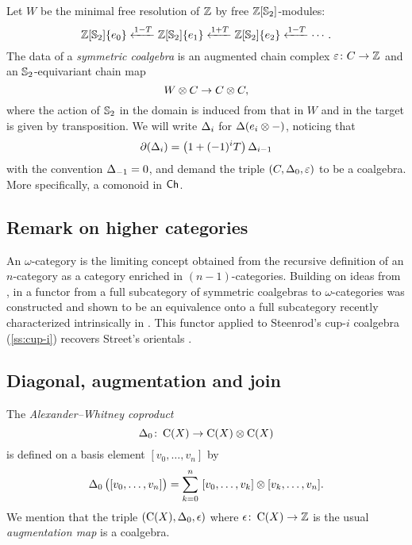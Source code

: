 Let $W$ be the minimal free resolution of $\mathbb{Z}$ by free $\mathbb{Z}[\mathbb{S}_2]$-modules:
\[
\mathbb{Z}[\mathbb{S}_2]\{e_0\} \xleftarrow{1-T} \mathbb{Z}[\mathbb{S}_2]\{e_1\} \xleftarrow{1+T} \mathbb{Z}[\mathbb{S}_2]\{e_2\} \xleftarrow{1-T} \dotsb.
\]
The data of a \textit{symmetric coalgebra} is an augmented chain complex $\varepsilon \colon C \to \mathbb{Z}$ and an $\mathbb{S}_2$-equivariant chain map
\[
W \otimes C \to C \otimes C,
\]
where the action of $\mathbb{S}_2$ in the domain is induced from that in $W$ and in the target is given by transposition.
We will write $\operatorname{\Delta}_i$ for $\operatorname{\Delta}(e_i \otimes -)$, noticing that
\[
\partial(\operatorname{\Delta}_i) = \big( 1+(-1)^i T \big) \operatorname{\Delta}_{i-1}
\]
with the convention $\operatorname{\Delta}_{-1} = 0$, and demand the triple $(C, \operatorname{\Delta}_0, \varepsilon)$ to be a coalgebra.
More specifically, a comonoid in $\mathsf{Ch}$.

\subsection{Remark on higher categories}
\label{ss:higher categories}

An $\omega$-category is the limiting concept obtained from the recursive definition of an $n$-category as a category enriched in $(n-1)$-categories.
Building on ideas from \cite{brown1981cubes, kapranov1991polycategory, steiner2004omega}, in \cite{medina2020globular} a functor from a full subcategory of symmetric coalgebras to $\omega$-categories was constructed and shown to be an equivalence onto a full subcategory recently characterized intrinsically in \cite{ozornova2022steiner}.
This functor applied to Steenrod's cup-$i$ coalgebra (\cref{ss:cup-i}) recovers Street's orientals \cite{street1987orientals}.

\subsection{Diagonal, augmentation and join}

The \textit{Alexander--Whitney coproduct}
\[
\operatorname{\Delta}_0 \colon \operatorname{C}(X) \to \operatorname{C}(X) \otimes \operatorname{C}(X)
\]
is defined on a basis element $[v_0, \dots, v_n]$ by
\begin{equation*} \label{e:alexander-whitney coalgebra}
	\operatorname{\Delta}_0 \big( [v_0, \dots, v_n] \big) =
	\sum_{k=0}^n \ [v_0, \dots, v_k] \otimes [v_k, \dots, v_n].
\end{equation*}
We mention that the triple $(\operatorname{C}(X), \operatorname{\Delta}_0, \operatorname{\epsilon})$ where $\operatorname{\epsilon} \colon \operatorname{C}(X) \to \mathbb{Z}$ is the usual \textit{augmentation map} is a coalgebra.

